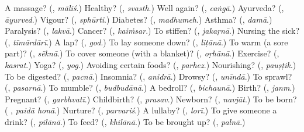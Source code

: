 \begin{tcolorbox}[breakable,colback=teal!4,colframe=teal!35!black,title={Before you move on}]
A massage? (\textbf{}, \emph{māliś}.) Healthy? (\textbf{}, \emph{svasth}.) Well again? (\textbf{}, \emph{caṅgā}.) Ayurveda? (\textbf{}, \emph{āyurved}.) Vigour? (\textbf{}, \emph{sphūrti}.) Diabetes? (\textbf{}, \emph{madhumeh}.) Asthma? (\textbf{}, \emph{damā}.) Paralysis? (\textbf{}, \emph{lakvā}.) Cancer? (\textbf{}, \emph{kaiṁsar}.) To stiffen? (\textbf{}, \emph{jakaṛnā}.) Nursing the sick? (\textbf{}, \emph{tīmārdārī}.) A lap? (\textbf{}, \emph{god}.) To lay someone down? (\textbf{}, \emph{liṭānā}.) To warm (a sore part)? (\textbf{}, \emph{sẽknā}.) To cover someone (with a blanket)? (\textbf{}, \emph{oṛhānā}.) Exercise? (\textbf{}, \emph{kasrat}.) Yoga? (\textbf{}, \emph{yog}.) Avoiding certain foods? (\textbf{}, \emph{parhez}.) Nourishing? (\textbf{}, \emph{pauṣṭik}.) To be digested? (\textbf{}, \emph{pacnā}.) Insomnia? (\textbf{}, \emph{anidrā}.) Drowsy? (\textbf{}, \emph{unīndā}.) To sprawl? (\textbf{}, \emph{pasarnā}.) To mumble? (\textbf{}, \emph{budbudānā}.) A bedroll? (\textbf{}, \emph{bichaunā}.) Birth? (\textbf{}, \emph{janm}.) Pregnant? (\textbf{}, \emph{garbhvatī}.) Childbirth? (\textbf{}, \emph{prasav}.) Newborn? (\textbf{}, \emph{navjāt}.) To be born? (\textbf{ }, \emph{paidā honā}.) Nurture? (\textbf{}, \emph{parvariś}.) A lullaby? (\textbf{}, \emph{lorī}.) To give someone a drink? (\textbf{}, \emph{pilānā}.) To feed? (\textbf{}, \emph{khilānā}.) To be brought up? (\textbf{}, \emph{palnā}.)
\end{tcolorbox}
